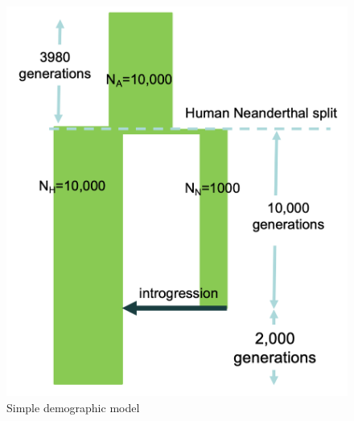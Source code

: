 \begin{figure}[htb]
    \centering
    \includegraphics[width=\textwidth]{chapter5/figures/fig5.2.png}
    \caption{Simple demographic model}
    \label{fig:5.2}
\end{figure}

